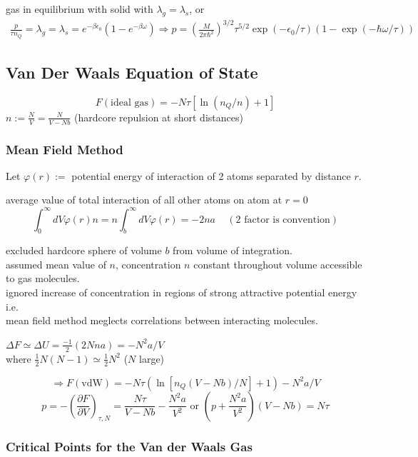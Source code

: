 gas in equilibrium with solid with $\lambda_g = \lambda_s$, or 
\[
\begin{gathered}
  \frac{p}{ \tau n_Q} = \lambda_g = \lambda_s = e^{-\beta \epsilon_0} ( 1-  e^{-\beta \omega } ) \Longrightarrow p = \left( \frac{M}{ 2\pi \hbar^2 } \right)^{3/2} \tau^{5/2} \exp{ (-\epsilon_0/\tau) } (1- \exp{ ( -\hbar \omega / \tau ) } )
\end{gathered}
\]


\subsection*{Van Der Waals Equation of State}


\[
F(\text{ideal gas}) = -N\tau [ \ln{ (n_Q/n) } + 1 ]
\]
$n:= \frac{N}{V} = \frac{N}{V-Nb}$ (hardcore repulsion at short distances)

\subsubsection*{Mean Field Method}

Let $\varphi(r) := $ potential energy of interaction of 2 atoms separated by distance $r$.

average value of total interaction of all other atoms on atom at $r=0$
\[
\int_0^{\infty} dV \varphi(r)n = n \int_b^{\infty} dV \varphi(r) = -2na \quad \, (2 \text{ factor is convention})
\]

excluded hardcore sphere of volume $b$ from volume of integration. \\
assumed mean value of $n$, concentration $n$ constant throughout volume accessible to gas molecules. \\
\phantom{ \quad \, } ignored increase of concentration in regions of strong attractive potential energy i.e. \\
\phantom{ \quad \quad \, } mean field method meglects correlations between interacting molecules.

$\Delta F \simeq \Delta U = \frac{-1}{2} (2 N na) = -N^2 a/ V $ \\
\phantom{\quad \, } where $\frac{1}{2} N(N-1) \simeq \frac{1}{2} N^2 $ ($N$ large)

\[
\Longrightarrow F(\text{vdW}) = -N\tau ( \ln{ [n_Q (V-Nb)/N ]} + 1) - N^2 a /V
\]
\[
p = -\left( \frac{ \partial F}{ \partial V} \right)_{\tau,N} = \frac{N\tau}{ V-Nb} - \frac{N^2 a}{V^2} \text{ or } \left( p + \frac{N^2 a}{V^2} \right)(V-Nb) = N\tau
\]

\subsubsection*{Critical Points for the Van der Waals Gas}

